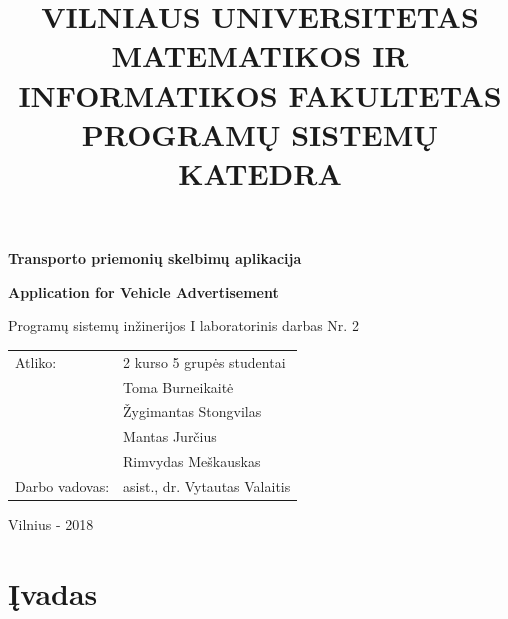 \documentclass[12pt]{article}
\title{VILNIAUS UNIVERSITETAS \\
MATEMATIKOS IR INFORMATIKOS FAKULTETAS \\
PROGRAMŲ SISTEMŲ KATEDRA}
\author{}
\date{}
\renewcommand{\baselinestretch}{1.5}
\begin{document}
	\clearpage
	\maketitle
	\thispagestyle{empty}

	\bigbreak
	\bigbreak
	\bigbreak
	\bigbreak

	\begin{center}
		\begin{Large}
			\textbf{Transporto priemonių skelbimų aplikacija} \\
		\end{Large}
		\begin{large}
			\textbf{Application for Vehicle Advertisement} \\
		\end{large}
		Programų sistemų inžinerijos I laboratorinis darbas Nr. 2 \\

		\bigbreak
		\bigbreak
		\bigbreak
		\bigbreak
		\bigbreak
		\bigbreak
		\bigbreak
		\bigbreak
		\bigbreak

		\begin{tabular}{ll}
			Atliko:        & 2 kurso 5 grupės studentai \\
		               	   & Toma Burneikaitė \\
		               	   & Žygimantas Stongvilas \\
		                   & Mantas Jurčius \\
		                   & Rimvydas Meškauskas \\
			Darbo vadovas: & asist., dr. Vytautas Valaitis
		\end{tabular}

		\bigbreak
		\bigbreak
		\bigbreak
		\bigbreak
		\bigbreak
		\bigbreak
		\bigbreak
		\bigbreak
		\bigbreak

		Vilnius - 2018
	\end{center}
	\pagebreak
	
	\renewcommand{\baselinestretch}{0.5}
	\tableofcontents
	\renewcommand{\baselinestretch}{1.5}
	\pagebreak	
	
	\section*{Įvadas}	
	
\end{document}
